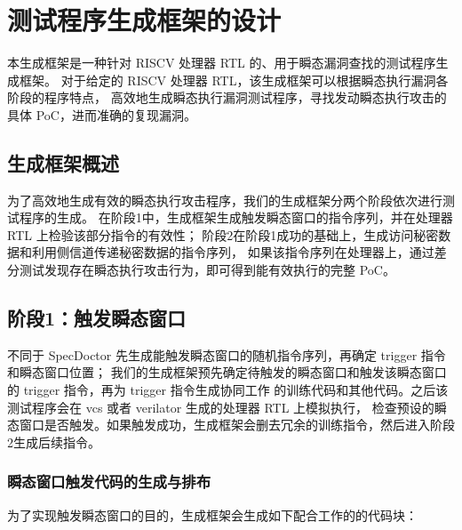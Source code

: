 \section{测试程序生成框架的设计}

本生成框架是一种针对 RISCV 处理器 RTL 的、用于瞬态漏洞查找的测试程序生成框架。
对于给定的 RISCV 处理器 RTL，该生成框架可以根据瞬态执行漏洞各阶段的程序特点，
高效地生成瞬态执行漏洞测试程序，寻找发动瞬态执行攻击的具体 PoC，进而准确的复现漏洞。 \par

\subsection{生成框架概述}

为了高效地生成有效的瞬态执行攻击程序，我们的生成框架分两个阶段依次进行测试程序的生成。
在阶段1中，生成框架生成触发瞬态窗口的指令序列，并在处理器 RTL 上检验该部分指令的有效性；
阶段2在阶段1成功的基础上，生成访问秘密数据和利用侧信道传递秘密数据的指令序列，
如果该指令序列在处理器上，通过差分测试发现存在瞬态执行攻击行为，即可得到能有效执行的完整 PoC。\par

\subsection{阶段1：触发瞬态窗口}

不同于 SpecDoctor 先生成能触发瞬态窗口的随机指令序列，再确定 trigger 指令和瞬态窗口位置；
我们的生成框架预先确定待触发的瞬态窗口和触发该瞬态窗口的 trigger 指令，再为 trigger 指令生成协同工作
的训练代码和其他代码。之后该测试程序会在 vcs 或者 verilator 生成的处理器 RTL 上模拟执行，
检查预设的瞬态窗口是否触发。如果触发成功，生成框架会删去冗余的训练指令，然后进入阶段2生成后续指令。\par

\subsubsection{瞬态窗口触发代码的生成与排布}

为了实现触发瞬态窗口的目的，生成框架会生成如下配合工作的的代码块：\par

